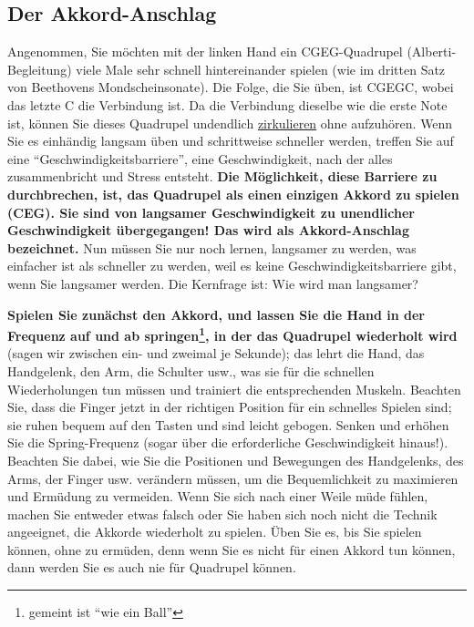 \subsection{Der Akkord-Anschlag}
\label{c1ii9}

Angenommen, Sie möchten mit der linken Hand ein CGEG-Quadrupel (Alberti-Begleitung) viele Male sehr schnell hintereinander spielen (wie im dritten Satz von Beethovens Mondscheinsonate).
Die Folge, die Sie üben, ist CGEGC, wobei das letzte C die Verbindung ist.
Da die Verbindung dieselbe wie die erste Note ist, können Sie dieses Quadrupel undendlich \hyperref[c1iii2]{zirkulieren} ohne aufzuhören.
Wenn Sie es einhändig langsam üben und schrittweise schneller werden, treffen Sie auf eine \enquote{Geschwindigkeitsbarriere}, eine Geschwindigkeit, nach der alles zusammenbricht und Stress entsteht.
\textbf{Die Möglichkeit, diese Barriere zu durchbrechen, ist, das Quadrupel als einen einzigen Akkord zu spielen (CEG).
Sie sind von langsamer Geschwindigkeit zu unendlicher Geschwindigkeit übergegangen!
Das wird als Akkord-Anschlag bezeichnet.}
Nun müssen Sie nur noch lernen, langsamer zu werden, was einfacher ist als schneller zu werden, weil es keine Geschwindigkeitsbarriere gibt, wenn Sie langsamer werden.
Die Kernfrage ist: Wie wird man langsamer?

\textbf{Spielen Sie zunächst den Akkord, und lassen Sie die Hand in der Frequenz auf und ab springen\footnote{gemeint ist \enquote{wie ein Ball}}, in der das Quadrupel wiederholt wird} (sagen wir zwischen ein- und zweimal je Sekunde); das lehrt die Hand, das Handgelenk, den Arm, die Schulter usw., was sie für die schnellen Wiederholungen tun müssen und trainiert die entsprechenden Muskeln.
Beachten Sie, dass die Finger jetzt in der richtigen Position für ein schnelles Spielen sind; sie ruhen bequem auf den Tasten und sind leicht gebogen.
Senken und erhöhen Sie die Spring-Frequenz (sogar über die erforderliche Geschwindigkeit hinaus!).
Beachten Sie dabei, wie Sie die Positionen und Bewegungen des Handgelenks, des Arms, der Finger usw. verändern müssen, um die Bequemlichkeit zu maximieren und Ermüdung zu vermeiden.
Wenn Sie sich nach einer Weile müde fühlen, machen Sie entweder etwas falsch oder Sie haben sich noch nicht die Technik angeeignet, die Akkorde wiederholt zu spielen.
Üben Sie es, bis Sie spielen können, ohne zu ermüden, denn wenn Sie es nicht für einen Akkord tun können, dann werden Sie es auch nie für Quadrupel können.


